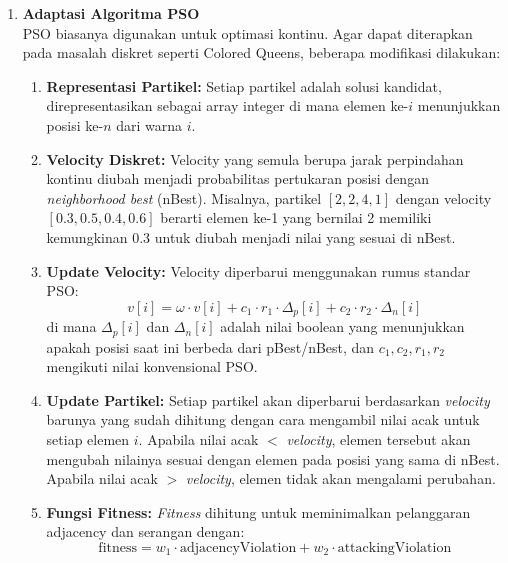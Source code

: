 \documentclass[a4paper,twoside]{article}
\begin{document}
\begin{enumerate}
	\item \textbf{Adaptasi Algoritma PSO} \\
	PSO biasanya digunakan untuk optimasi kontinu. Agar dapat diterapkan pada masalah diskret seperti Colored Queens, beberapa modifikasi dilakukan:
	\begin{enumerate}
		\item \textbf{Representasi Partikel:} Setiap partikel adalah solusi kandidat, direpresentasikan sebagai array integer di mana elemen ke-$i$ menunjukkan posisi ke-$n$ dari warna $i$.
		\item \textbf{Velocity Diskret:} Velocity yang semula berupa jarak perpindahan kontinu diubah menjadi probabilitas pertukaran posisi dengan \textit{neighborhood best} (nBest). Misalnya, partikel $[2,2,4,1]$ dengan velocity $[0.3,0.5,0.4,0.6]$ berarti elemen ke-1 yang bernilai 2 memiliki kemungkinan 0.3 untuk diubah menjadi nilai yang sesuai di nBest.
		\item \textbf{Update Velocity:} Velocity diperbarui menggunakan rumus standar PSO:
		\[
		v[i] = \omega \cdot v[i] + c_1 \cdot r_1 \cdot \Delta_p[i] + c_2 \cdot r_2 \cdot \Delta_n[i]
		\]
		di mana $\Delta_p[i]$ dan $\Delta_n[i]$ adalah nilai boolean yang menunjukkan apakah posisi saat ini berbeda dari pBest/nBest, dan $c_1,c_2,r_1,r_2$ mengikuti nilai konvensional PSO.
		\item \textbf{Update Partikel:} Setiap partikel akan diperbarui berdasarkan \textit{velocity} barunya yang sudah dihitung dengan cara mengambil nilai acak untuk setiap elemen $i$. Apabila nilai acak $<$ \textit{velocity}, elemen tersebut akan mengubah nilainya sesuai dengan elemen pada posisi yang sama di nBest. Apabila nilai acak $>$ \textit{velocity}, elemen tidak akan mengalami perubahan.
		\item \textbf{Fungsi Fitness:} \textit{Fitness} dihitung untuk meminimalkan pelanggaran adjacency dan serangan dengan:
		\[
		\text{fitness} = w_1 \cdot \text{adjacencyViolation} + w_2 \cdot \text{attackingViolation}
		\]
		

\end{enumerate}
\end{enumerate}
\end{document}
